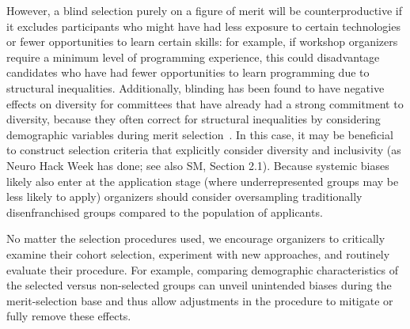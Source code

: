 However, a blind selection purely on a figure of merit will be counterproductive if it excludes participants who might have had less exposure to certain technologies or fewer opportunities to learn certain skills: for example, if workshop organizers require a minimum level of programming experience, this could disadvantage candidates who have had fewer opportunities to learn programming due to structural inequalities. 
Additionally, blinding has been found to have negative effects on diversity for committees that have already had a strong commitment to diversity, because they often correct for structural inequalities by considering demographic variables during merit selection~\cite{behaghel2015unintended}.
In this case, it may be beneficial to construct selection criteria that explicitly consider diversity and inclusivity (as Neuro Hack Week has done; see also SM, Section 2.1). 
Because systemic biases likely also enter at the application stage (where underrepresented groups may be less likely to apply) organizers should consider oversampling traditionally disenfranchised groups compared to the population of applicants. 

No matter the selection procedures used, we encourage organizers to critically examine their cohort selection, experiment with new approaches, and routinely evaluate their procedure. For example, comparing demographic characteristics of the selected versus non-selected groups can unveil unintended biases during the merit-selection base and thus allow adjustments in the procedure to mitigate or fully remove these effects.
